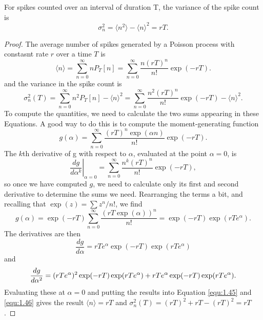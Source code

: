 \begin{coro}
  For spikes counted over an interval of duration T, the variance of the spike count is
  \begin{equation}
    \sigma^2_n = \langle n^2 \rangle -\langle n  \rangle ^2=rT.
  \end{equation}
  \begin{proof}
    The average number of spikes generated by a Poisson process with constasnt rate $r$ over a time $T$ is 
    \begin{equation}
      \langle n\rangle=\sum_{n=0}^\infty nP_T[n]=\sum_{n=0}^\infty\frac{n(rT)^n}{n!}\exp(-rT).
      \label{equ:1.45}
    \end{equation}
    and the variance in the spike count is
    \begin{equation}
      \sigma_n^2(T)=\sum_{n=0}^\infty n^2P_T[n]-\langle n\rangle^2=\sum_{n=0}^\infty\frac{n^2(rT)^n}{n!}\exp(-rT)-\langle n\rangle^2.
      \label{equ:1.46}
    \end{equation}
    To compute the quantities, we need to calculate the two sums appearing in these Equations. A good way to do this is to compute the moment-generating function
    \begin{equation}
      g(\alpha)=\sum_{n=0}^\infty\frac{(rT)^n\exp(\alpha n)}{n!}\exp(-rT).
      \label{equ:1.47}
    \end{equation}      
    The $k$th derivative of g with respect to $\alpha$, evaluated at the point $\alpha=0$, is
    \begin{equation}
      \left.\frac{dg}{d\alpha^k}\right|_{\alpha=0}=\sum_{n=0}^\infty\frac{n^k(rT)^n}{n!}\exp(-rT),
      \label{equ:1.48}
    \end{equation}        
    so once we have computed $g$, we need to calculate only its first and second derivative to determine the sums we need. Rearranging the terms a bit, and recalling that $\exp(z)=\sum z^n/n!$, we find\\        
    \begin{equation}
      g(\alpha)=\exp(-rT)\sum_{n=0}^\infty\frac{(rT\exp(\alpha))^n}{n!}=\exp(-rT)\exp(rTe^\alpha).
      \label{equ:1.49}
    \end{equation}
    The derivatives are then \\
    \begin{equation}
      \frac{dg}{d\alpha}=rTe^\alpha \exp(-rT)\exp(rTe^\alpha)
      \label{equ:1.50}
    \end{equation}
    and\\
    \begin{equation}
      \small    \frac{dg}{d\alpha^2}=(rTe^\alpha)^2\exp(-rT)\exp(rTe^\alpha)+rTe^\alpha \exp(-rT)\exp(rTe^\alpha).
      \label{equ:1.51}
    \end{equation}
    Evaluating these at $\alpha=0$ and putting the results into Equation \ref{equ:1.45} and \ref{equ:1.46} gives the result $\langle n\rangle=rT$ and $\sigma_n^2(T)=(rT)^2+rT-(rT)^2=rT$.
  \end{proof}\qedhere
\end{coro}


